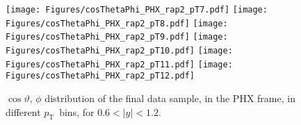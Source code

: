 \documentclass[12pt]{article}
\newcommand{\pt}{$p_{\mathrm{T}}$}
\begin{document}
\begin{figure}[htbp]
\centering
\texttt{[image: Figures/cosThetaPhi\_PHX\_rap2\_pT7.pdf]}
\texttt{[image: Figures/cosThetaPhi\_PHX\_rap2\_pT8.pdf]}
\texttt{[image: Figures/cosThetaPhi\_PHX\_rap2\_pT9.pdf]}
\texttt{[image: Figures/cosThetaPhi\_PHX\_rap2\_pT10.pdf]}
\texttt{[image: Figures/cosThetaPhi\_PHX\_rap2\_pT11.pdf]}
\texttt{[image: Figures/cosThetaPhi\_PHX\_rap2\_pT12.pdf]}
\caption{$\cos\vartheta,\,\phi$ distribution of the final data sample, 
	in the PHX frame, in different \pt\ bins, for $0.6 < |y| < 1.2$.}
\end{figure}
\clearpage
\end{document}
